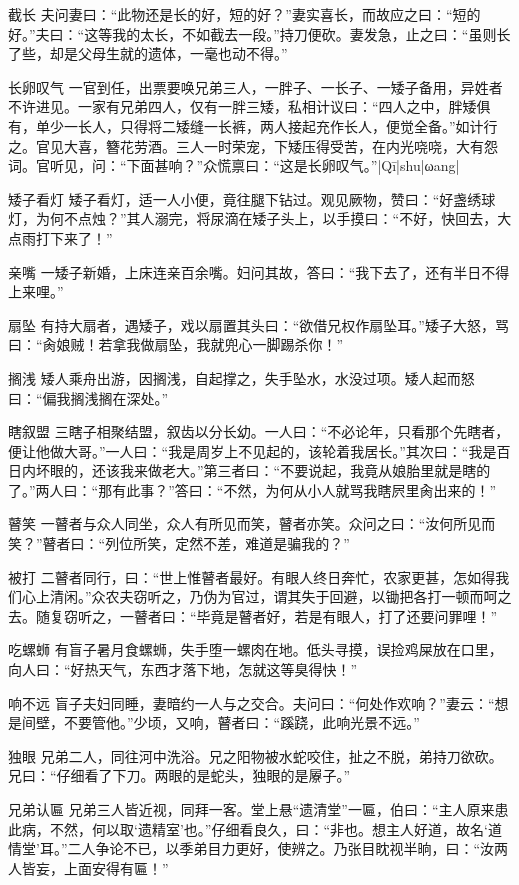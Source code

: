 \documentclass[12pt,UTF8]{ctexbook}
\begin{document}
截长
夫问妻曰：“此物还是长的好，短的好？”妻实喜长，而故应之曰：“短的好。”夫曰：“这等我的太长，不如截去一段。”持刀便砍。妻发急，止之曰：“虽则长了些，却是父母生就的遗体，一毫也动不得。”

长卵叹气
一官到任，出票要唤兄弟三人，一胖子、一长子、一矮子备用，异姓者不许进见。一家有兄弟四人，仅有一胖三矮，私相计议曰：“四人之中，胖矮俱有，单少一长人，只得将二矮缝一长裤，两人接起充作长人，便觉全备。”如计行之。官见大喜，簪花劳酒。三人一时荣宠，下矮压得受苦，在内光哓哓，大有怨词。官听见，问：“下面甚响？”众慌禀曰：“这是长卵叹气。”|Qī|shu|ωang|

矮子看灯
矮子看灯，适一人小便，竟往腿下钻过。观见厥物，赞曰：“好盏绣球灯，为何不点烛？”其人溺完，将尿滴在矮子头上，以手摸曰：“不好，快回去，大点雨打下来了！”

亲嘴
一矮子新婚，上床连亲百余嘴。妇问其故，答曰：“我下去了，还有半日不得上来哩。”

扇坠
有持大扇者，遇矮子，戏以扇置其头曰：“欲借兄权作扇坠耳。”矮子大怒，骂曰：“肏娘贼！若拿我做扇坠，我就兜心一脚踢杀你！”

搁浅
矮人乘舟出游，因搁浅，自起撑之，失手坠水，水没过项。矮人起而怒曰：“偏我搁浅搁在深处。”

瞎叙盟
三瞎子相聚结盟，叙齿以分长幼。一人曰：“不必论年，只看那个先瞎者，便让他做大哥。”一人曰：“我是周岁上不见起的，该轮着我居长。”其次曰：“我是百日内坏眼的，还该我来做老大。”第三者曰：“不要说起，我竟从娘胎里就是瞎的了。”两人曰：“那有此事？”答曰：“不然，为何从小人就骂我瞎屄里肏出来的！”

瞽笑
一瞽者与众人同坐，众人有所见而笑，瞽者亦笑。众问之曰：“汝何所见而笑？”瞽者曰：“列位所笑，定然不差，难道是骗我的？”

被打
二瞽者同行，曰：“世上惟瞽者最好。有眼人终日奔忙，农家更甚，怎如得我们心上清闲。”众农夫窃听之，乃伪为官过，谓其失于回避，以锄把各打一顿而呵之去。随复窃听之，一瞽者曰：“毕竟是瞽者好，若是有眼人，打了还要问罪哩！”

吃螺蛳
有盲子暑月食螺蛳，失手堕一螺肉在地。低头寻摸，误捡鸡屎放在口里，向人曰：“好热天气，东西才落下地，怎就这等臭得快！”

响不远
盲子夫妇同睡，妻暗约一人与之交合。夫问曰：“何处作欢响？”妻云：“想是间壁，不要管他。”少顷，又响，瞽者曰：“蹊跷，此响光景不远。”

独眼
兄弟二人，同往河中洗浴。兄之阳物被水蛇咬住，扯之不脱，弟持刀欲砍。兄曰：“仔细看了下刀。两眼的是蛇头，独眼的是屪子。”

兄弟认匾
兄弟三人皆近视，同拜一客。堂上悬“遗清堂”一匾，伯曰：“主人原来患此病，不然，何以取‘遗精室’也。”仔细看良久，曰：“非也。想主人好道，故名‘道情堂’耳。”二人争论不已，以季弟目力更好，使辨之。乃张目眈视半晌，曰：“汝两人皆妄，上面安得有匾！”
\end{document}
